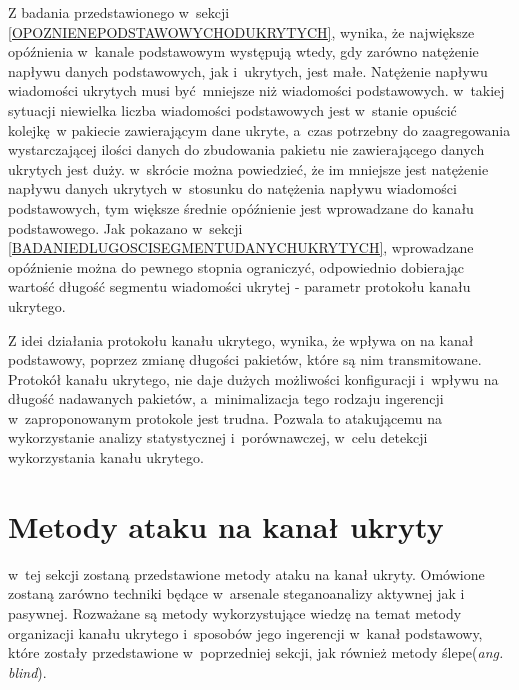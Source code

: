 \documentclass[a4paper, twoside, 12pt]{report}
\begin{document}
        Z badania przedstawionego w~sekcji \ref{OPOZNIENEPODSTAWOWYCHODUKRYTYCH},
        wynika, że największe opóźnienia w~kanale podstawowym
        występują wtedy, gdy zarówno natężenie napływu danych podstawowych, jak i~ukrytych, jest małe.
        Natężenie napływu wiadomości ukrytych musi być mniejsze niż wiadomości podstawowych.
        w~takiej sytuacji niewielka liczba wiadomości podstawowych jest w~stanie
        opuścić kolejkę w pakiecie zawierającym dane ukryte, a~czas potrzebny do
        zaagregowania wystarczającej ilości danych do zbudowania pakietu nie
        zawierającego danych ukrytych jest duży. w~skrócie można powiedzieć, że
        im mniejsze jest natężenie napływu danych ukrytych w~stosunku do natężenia
        napływu wiadomości podstawowych, tym większe średnie opóźnienie jest wprowadzane
        do kanału podstawowego. Jak pokazano w~sekcji \ref{BADANIEDLUGOSCISEGMENTUDANYCHUKRYTYCH},
        wprowadzane opóźnienie można do pewnego stopnia ograniczyć, odpowiednio
        dobierając wartość długość segmentu wiadomości ukrytej - parametr protokołu
        kanału ukrytego.

        Z idei działania protokołu kanału ukrytego, wynika, że wpływa on na kanał
        podstawowy, poprzez zmianę długości pakietów, które są nim transmitowane.
        Protokół kanału ukrytego, nie daje dużych możliwości konfiguracji i~wpływu
        na długość nadawanych pakietów, a~minimalizacja tego rodzaju ingerencji
        w~zaproponowanym protokole jest trudna. Pozwala to atakującemu
        na wykorzystanie analizy statystycznej i~porównawczej, w~celu detekcji
        wykorzystania kanału ukrytego.

    \section{Metody ataku na kanał ukryty}
       w~tej sekcji zostaną przedstawione metody ataku na kanał ukryty. Omówione
       zostaną zarówno techniki będące w~arsenale steganoanalizy aktywnej jak i
       pasywnej. Rozważane są metody wykorzystujące wiedzę na temat metody organizacji kanału ukrytego
       i~sposobów jego ingerencji w~kanał podstawowy, które zostały przedstawione w~poprzedniej sekcji,
       jak również metody ślepe(\emph{ang. blind}).
\end{document}
